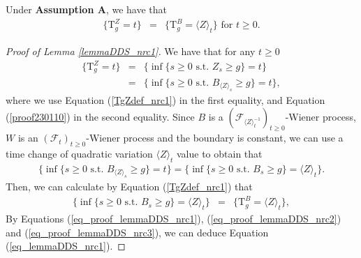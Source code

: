 \documentclass[aop]{imsart}
\theoremstyle{plain}
\theoremstyle{remark}
\newcommand{\Tau}{\mathrm{T}}
\begin{document}
\begin{lemma}
\label{lemmaDDS_nrc1}
Under \textbf{Assumption A}, we have that
\begin{eqnarray}
\label{eq_lemmaDDS_nrc1}
\big\{ \Tau_g^Z =t \big\} & = & \big\{ \Tau_g^B = \langle Z\rangle_{t} \big\} \text{ for } t \geq 0.
\end{eqnarray}
\end{lemma}
\begin{proof}[Proof of Lemma \ref{lemmaDDS_nrc1}]
We have that for any $t \geq 0$
\begin{eqnarray}
\nonumber \big\{ \Tau_g^Z =t \big\} 
& = & \big\{ \inf \{s \geq 0 \text{ s.t. } Z_s \geq g\} = t \big\}\\ \label{eq_proof_lemmaDDS_nrc1} 
& = & \big\{ \inf \{s \geq 0\text{ s.t. } B_{\langle Z\rangle_{s}} \geq g\} = t \big\},
\end{eqnarray}
where we use Equation (\ref{TgZdef_nrc1}) in the first equality, and Equation (\ref{proof230110}) in the second equality. Since $B$ is a $({\mathcal {F}}_{\langle Z\rangle_{t}^{-1}})_{t\geq 0}$-Wiener process, $W$ is an $({\mathcal {F}}_{t})_{t\geq 0}$-Wiener process and the boundary is constant, we can use a time change of quadratic variation $\langle Z\rangle_t$ value to obtain that
\begin{eqnarray}
\label{eq_proof_lemmaDDS_nrc2} \big\{ \inf \{s \geq 0\text{ s.t. } B_{\langle Z\rangle_{s}} \geq g\} = t \big\} = \big\{\inf \{s \geq 0 \text{ s.t. } B_s \geq g \} = \langle Z\rangle_t \big\}.
\end{eqnarray}
Then, we can calculate by Equation (\ref{TgZdef_nrc1}) that
\begin{eqnarray}
\label{eq_proof_lemmaDDS_nrc3} \big\{\inf \{s \geq 0 \text{ s.t. } B_s \geq g \} = \langle Z\rangle_t \big\} & = & \big\{ \Tau^B_g = \langle Z\rangle_t \big\}, 
\end{eqnarray}
By Equations (\ref{eq_proof_lemmaDDS_nrc1}), (\ref{eq_proof_lemmaDDS_nrc2}) and (\ref{eq_proof_lemmaDDS_nrc3}), we can deduce Equation (\ref{eq_lemmaDDS_nrc1}).
\end{proof}
\end{document}
